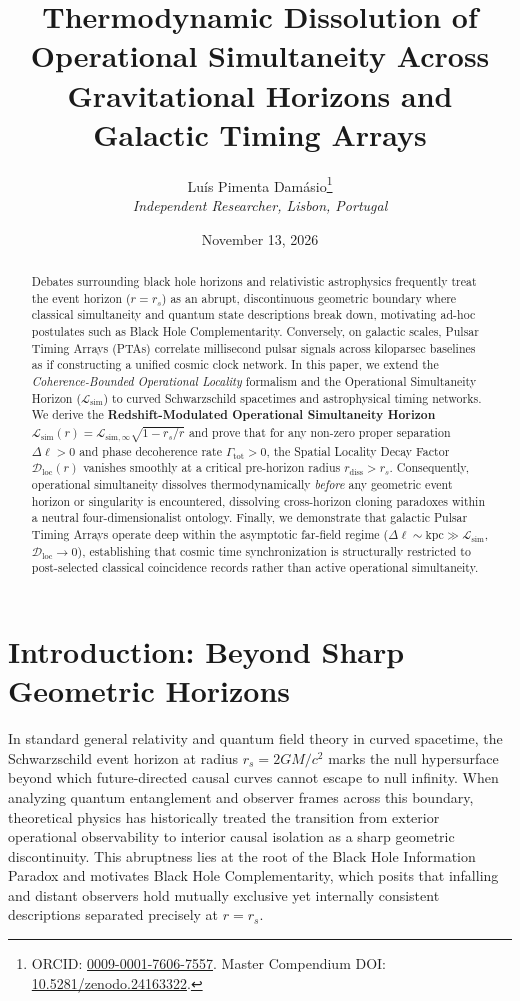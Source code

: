\documentclass[11pt,a4paper]{article}
\title{\textbf{Thermodynamic Dissolution of Operational Simultaneity Across Gravitational Horizons and Galactic Timing Arrays}}
\author{
    Luís {Pimenta Damásio}\thanks{ORCID: \href{https://orcid.org/0009-0001-7606-7557}{0009-0001-7606-7557}. Master Compendium DOI: \href{https://doi.org/10.5281/zenodo.24163322}{10.5281/zenodo.24163322}.}\\
    \textit{Independent Researcher, Lisbon, Portugal}
}
\date{November 13, 2026}
\begin{document}
\maketitle

\begin{abstract}
Debates surrounding black hole horizons and relativistic astrophysics frequently treat the event horizon ($r = r_s$) as an abrupt, discontinuous geometric boundary where classical simultaneity and quantum state descriptions break down, motivating ad-hoc postulates such as Black Hole Complementarity. Conversely, on galactic scales, Pulsar Timing Arrays (PTAs) correlate millisecond pulsar signals across kiloparsec baselines as if constructing a unified cosmic clock network. In this paper, we extend the \textit{Coherence-Bounded Operational Locality} formalism and the Operational Simultaneity Horizon ($\mathcal{L}_{\mathrm{sim}}$) to curved Schwarzschild spacetimes and astrophysical timing networks. We derive the \textbf{Redshift-Modulated Operational Simultaneity Horizon} $\mathcal{L}_{\mathrm{sim}}(r) = \mathcal{L}_{\mathrm{sim},\infty}\sqrt{1 - r_s/r}$ and prove that for any non-zero proper separation $\Delta\ell > 0$ and phase decoherence rate $\Gamma_{\mathrm{tot}} > 0$, the Spatial Locality Decay Factor $\mathcal{D}_{\mathrm{loc}}(r)$ vanishes smoothly at a critical pre-horizon radius $r_{\mathrm{diss}} > r_s$. Consequently, operational simultaneity dissolves thermodynamically \textit{before} any geometric event horizon or singularity is encountered, dissolving cross-horizon cloning paradoxes within a neutral four-dimensionalist ontology. Finally, we demonstrate that galactic Pulsar Timing Arrays operate deep within the asymptotic far-field regime ($\Delta\ell \sim \mathrm{kpc} \gg \mathcal{L}_{\mathrm{sim}}$, $\mathcal{D}_{\mathrm{loc}} \to 0$), establishing that cosmic time synchronization is structurally restricted to post-selected classical coincidence records rather than active operational simultaneity.
\end{abstract}

\section{Introduction: Beyond Sharp Geometric Horizons}

In standard general relativity and quantum field theory in curved spacetime, the Schwarzschild event horizon at radius $r_s = 2GM/c^2$ marks the null hypersurface beyond which future-directed causal curves cannot escape to null infinity. When analyzing quantum entanglement and observer frames across this boundary, theoretical physics has historically treated the transition from exterior operational observability to interior causal isolation as a sharp geometric discontinuity. This abruptness lies at the root of the Black Hole Information Paradox and motivates Black Hole Complementarity, which posits that infalling and distant observers hold mutually exclusive yet internally consistent descriptions separated precisely at $r = r_s$.
\end{document}
